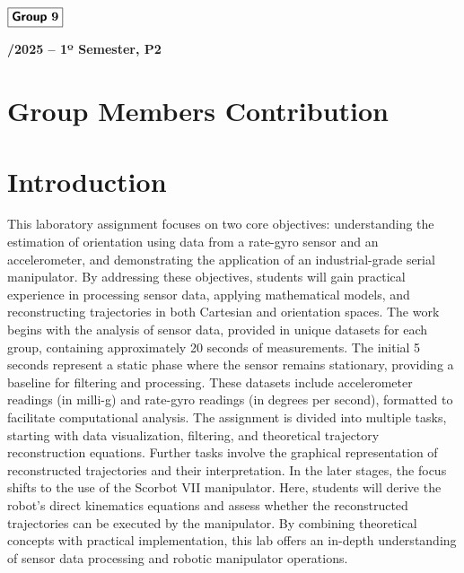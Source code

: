 \documentclass[12pt]{article}
\begin{document}
\begin{flushleft}
    \large $\boxed{\text{\bf \fontfamily{cmss}\selectfont Group} \ \textbf{9}}$\\[4.0cm]
\end{flushleft}
    
\begin{center}
    \large \bf {}/2025 -- 1º Semester, P2
\end{center}

\thispagestyle{empty}

\setcounter{page}{0}

\newpage

\tableofcontents 

\newpage

\section{Group Members Contribution} %

\section{Introduction} 

This laboratory assignment focuses on two core objectives: understanding the estimation of orientation using data from a rate-gyro sensor and an accelerometer, and demonstrating the application of an industrial-grade serial manipulator. By addressing these objectives, students will gain practical experience in processing sensor data, applying mathematical models, and reconstructing trajectories in both Cartesian and orientation spaces.
The work begins with the analysis of sensor data, provided in unique datasets for each group, containing approximately 20 seconds of measurements. The initial 5 seconds represent a static phase where the sensor remains stationary, providing a baseline for filtering and processing. These datasets include accelerometer readings (in milli-g) and rate-gyro readings (in degrees per second), formatted to facilitate computational analysis.
The assignment is divided into multiple tasks, starting with data visualization, filtering, and theoretical trajectory reconstruction equations. Further tasks involve the graphical representation of reconstructed trajectories and their interpretation. In the later stages, the focus shifts to the use of the Scorbot VII manipulator. Here, students will derive the robot's direct kinematics equations and assess whether the reconstructed trajectories can be executed by the manipulator.
By combining theoretical concepts with practical implementation, this lab offers an in-depth understanding of sensor data processing and robotic manipulator operations. 
\end{document}
